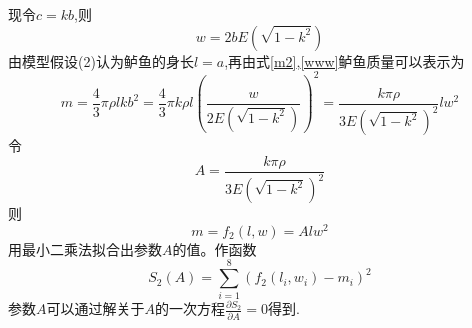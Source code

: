 \documentclass[UTF8,a4paper]{ctexart}
\numberwithin{equation}{section}%
\numberwithin{table}{section}
\numberwithin{figure}{section}
\begin{document}
现令$c=kb$,则
\begin{equation}
	w=2bE(\sqrt{1-k^2})
	\label{www}
\end{equation}
由模型假设(2)认为鲈鱼的身长$l=a$,再由式\eqref{m2},\eqref{www}鲈鱼质量可以表示为
\begin{equation}
	m=\frac{4}{3}\pi \rho l kb^2=\frac{4}{3}\pi k \rho l\left( \frac{w}{2E(\sqrt{1-k^2})}\right)^2=\frac{k \pi \rho}{3E(\sqrt{1-k^2})^2}lw^2
	\label{nihe2}
\end{equation}
令\begin{equation}
	A=\frac{k \pi \rho}{3E(\sqrt{1-k^2})^2}
	\label{xx}
\end{equation}
则\begin{equation}
	m=f_2(l,w)=A l w^2
	\label{nihe22}
\end{equation}
用最小二乘法拟合出参数$A$的值。作函数\begin{equation}
	S_2(A)=\sum_{i=1}^8(f_2(l_i,w_i)-m_i)^2
	\label{s2}
\end{equation}
参数$A$可以通过解关于$A$的一次方程$\frac{\partial S_2}{\partial A}=0$得到.

\FloatBarrier%
\end{document}
